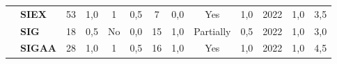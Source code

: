 \begin{table}[!htb]
\begin{tabular}{c|p{2cm}|cc|cc|cc|cc|cc|c}
    \rowcolor[rgb]{0.898,0.898,0.898} {\cellcolor[rgb]{0.753,0.753,0.753}}          & {\cellcolor[rgb]{0.753,0.753,0.753}}\textbf{SIEX}                                                  & 53                                                                        & 1,0                                                                       & 1                                                                         & 0,5                                                                      & 7                                                        & 0,0                                               & Yes                                                & 1,0                                               & 2022                                               & 1,0                                                                                                                                                 & 3,5 \\
    {\cellcolor[rgb]{0.753,0.753,0.753}}                                            & {\cellcolor[rgb]{0.753,0.753,0.753}}\textbf{SIG}                                                   & 18                                                                        & 0,5                                                                       & No                                                                        & 0,0                                                                      & 15                                                       & 1,0                                               & Partially                                          & 0,5                                               & 2022                                               & 1,0                                                                                                                                                 & 3,0 \\
    \rowcolor[rgb]{0.898,0.898,0.898} {\cellcolor[rgb]{0.753,0.753,0.753}}          & {\cellcolor[rgb]{0.753,0.753,0.753}}\textbf{SIGAA}                                                 & 28                                                                        & 1,0                                                                       & 1                                                                         & 0,5                                                                      & 16                                                       & 1,0                                               & Yes                                                & 1,0                                               & 2022                                               & 1,0                                                                                                                                                 & 4,5 \\

\end{tabular}
\end{table}
